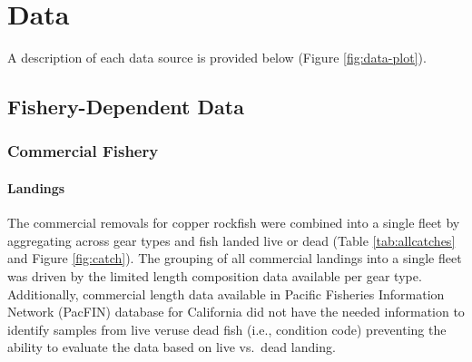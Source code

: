 \documentclass[11pt,
  english,
  a4paper,
]{article}
\begin{document}
\leavevmode\tagmcend\tagstructend\par


\hypertarget{data}{%
\section{Data}\label{data}}

\leavevmode\tagmcend\tagstructend


A description of each data source is provided below (Figure \ref{fig:data-plot}).

\leavevmode\tagmcend\tagstructend\par


\hypertarget{fishery-dependent-data}{%
\subsection{Fishery-Dependent Data}\label{fishery-dependent-data}}

\leavevmode\tagmcend\tagstructend


\hypertarget{commercial-fishery}{%
\subsubsection{Commercial Fishery}\label{commercial-fishery}}

\leavevmode\tagmcend\tagstructend


\hypertarget{landings}{%
\paragraph{Landings}\label{landings}}

\leavevmode\tagmcend\tagstructend


The commercial removals for copper rockfish were combined into a single fleet by aggregating across gear types and fish landed live or dead (Table \ref{tab:allcatches} and Figure \ref{fig:catch}). The grouping of all commercial landings into a single fleet was driven by the limited length composition data available per gear type. Additionally, commercial length data available in Pacific Fisheries Information Network (PacFIN) database for California did not have the needed information to identify samples from live veruse dead fish (i.e., condition code) preventing the ability to evaluate the data based on live vs.~dead landing.
\end{document}
